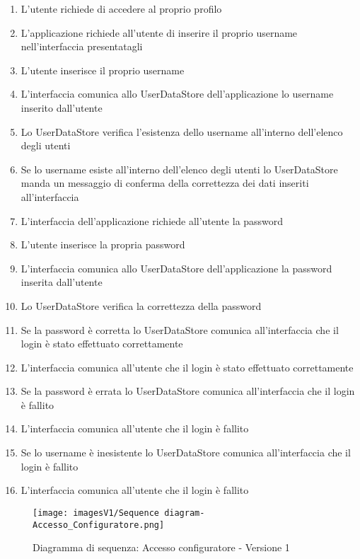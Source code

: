 \begin{enumerate}
    \item L'utente richiede di accedere al proprio profilo
    \item L'applicazione richiede all'utente di inserire il proprio username nell'interfaccia presentatagli
    \item L'utente inserisce il proprio username
    \item L'interfaccia comunica allo UserDataStore dell'applicazione lo username inserito dall'utente
    \item Lo UserDataStore verifica l'esistenza dello username all'interno dell'elenco degli utenti
    \item Se lo username esiste all'interno dell'elenco degli utenti lo UserDataStore manda un messaggio di conferma della correttezza dei dati inseriti all'interfaccia
    \item L'interfaccia dell'applicazione richiede all'utente la password
    \item L'utente inserisce la propria password
    \item L'interfaccia comunica allo UserDataStore dell'applicazione la password inserita dall'utente
    \item Lo UserDataStore verifica la correttezza della password
    \item Se la password è corretta lo UserDataStore comunica all'interfaccia che il login è stato effettuato correttamente
    \item L'interfaccia comunica all'utente che il login è stato effettuato correttamente
    \item Se la password è errata lo UserDataStore comunica all'interfaccia che il login è fallito
    \item L'interfaccia comunica all'utente che il login è fallito
    \item Se lo username è inesistente lo UserDataStore comunica all'interfaccia che il login è fallito
    \item L'interfaccia comunica all'utente che il login è fallito
\end{enumerate}

\begin{figure}[!]
\centering
\texttt{[image: imagesV1/Sequence diagram-Accesso\_Configuratore.png]}
\caption{\label{fig:Sequence diagram 1.1}Diagramma di sequenza: Accesso configuratore - Versione 1}
\end{figure}\bigskip

